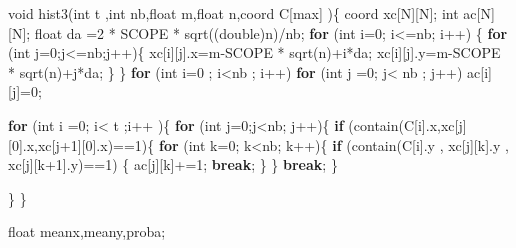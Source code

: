 \documentclass[]{article}
\newenvironment{Shaded}{}{}
\newcommand{\ControlFlowTok}[1]{\textcolor[rgb]{0.00,0.44,0.13}{\textbf{#1}}}
\newcommand{\DataTypeTok}[1]{\textcolor[rgb]{0.56,0.13,0.00}{#1}}
\newcommand{\DecValTok}[1]{\textcolor[rgb]{0.25,0.63,0.44}{#1}}
\newcommand{\NormalTok}[1]{#1}
\begin{document}
\begin{Shaded}
\begin{Highlighting}[]
\DataTypeTok{void}\NormalTok{ hist3(}\DataTypeTok{int}\NormalTok{ t ,}\DataTypeTok{int}\NormalTok{ nb,}\DataTypeTok{float}\NormalTok{ m,}\DataTypeTok{float}\NormalTok{ n,coord C[max]  )\{}
\NormalTok{       coord xc[N][N]; }\DataTypeTok{int}\NormalTok{ ac[N][N];}
       \DataTypeTok{float}\NormalTok{ da  =}\DecValTok{2}\NormalTok{ * SCOPE * sqrt((}\DataTypeTok{double}\NormalTok{)n)/nb;}
       \ControlFlowTok{for}\NormalTok{ (}\DataTypeTok{int}\NormalTok{ i=}\DecValTok{0}\NormalTok{; i<=nb; i++) \{}
              \ControlFlowTok{for}\NormalTok{ (}\DataTypeTok{int}\NormalTok{ j=}\DecValTok{0}\NormalTok{;j<=nb;j++)\{}
\NormalTok{                      xc[i][j].x=m-SCOPE * sqrt(n)+i*da;}
\NormalTok{                      xc[i][j].y=m-SCOPE * sqrt(n)+j*da;}
\NormalTok{              \}}
\NormalTok{       \}}
       \ControlFlowTok{for}\NormalTok{ (}\DataTypeTok{int}\NormalTok{ i=}\DecValTok{0}\NormalTok{ ; i<nb ; i++)}
               \ControlFlowTok{for}\NormalTok{ (}\DataTypeTok{int}\NormalTok{ j =}\DecValTok{0}\NormalTok{; j< nb ; j++)}
\NormalTok{                       ac[i][j]=}\DecValTok{0}\NormalTok{;}

       \ControlFlowTok{for}\NormalTok{ (}\DataTypeTok{int}\NormalTok{ i =}\DecValTok{0}\NormalTok{; i< t ;i++ )\{}
               \ControlFlowTok{for}\NormalTok{ (}\DataTypeTok{int}\NormalTok{ j=}\DecValTok{0}\NormalTok{;j<nb; j++)\{}
                       \ControlFlowTok{if}\NormalTok{ (contain(C[i].x,xc[j][}\DecValTok{0}\NormalTok{].x,xc[j+}\DecValTok{1}\NormalTok{][}\DecValTok{0}\NormalTok{].x)==}\DecValTok{1}\NormalTok{)\{}
                          \ControlFlowTok{for}\NormalTok{ (}\DataTypeTok{int}\NormalTok{ k=}\DecValTok{0}\NormalTok{; k<nb; k++)\{}
                              \ControlFlowTok{if}\NormalTok{ (contain(C[i].y , xc[j][k].y , xc[j][k+}\DecValTok{1}\NormalTok{].y)==}\DecValTok{1}\NormalTok{) \{}
\NormalTok{                                      ac[j][k]+=}\DecValTok{1}\NormalTok{;}
                                      \ControlFlowTok{break}\NormalTok{;}
\NormalTok{                              \}}
\NormalTok{                          \}}
                          \ControlFlowTok{break}\NormalTok{;}
\NormalTok{                       \}}

\NormalTok{               \}}
\NormalTok{       \}}

       \DataTypeTok{float}\NormalTok{ meanx,meany,proba;}


\end{Highlighting}
\end{Shaded}
\end{document}
